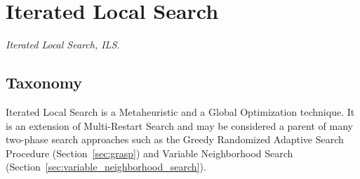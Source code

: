 

\section{Iterated Local Search} 
\label{sec:iterated_local_search}

\emph{Iterated Local Search, ILS.}

\subsection{Taxonomy}
Iterated Local Search is a Metaheuristic and a Global Optimization technique.
It is an extension of Multi-Restart Search and may be considered a parent of many two-phase search approaches such as the Greedy Randomized Adaptive Search Procedure (Section~\ref{sec:grasp}) and Variable Neighborhood Search (Section~\ref{sec:variable_neighborhood_search}).

